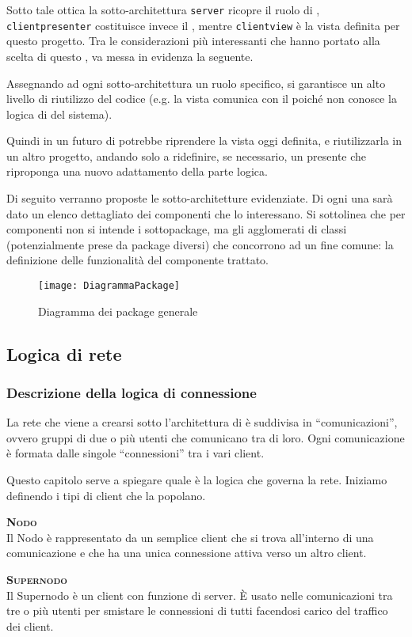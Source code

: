 Sotto tale ottica la sotto-architettura \texttt{server} ricopre il ruolo di , \texttt{clientpresenter} costituisce invece il , mentre \texttt{clientview} è la vista definita per questo progetto. Tra le considerazioni più interessanti che hanno portato alla scelta di questo , va messa in evidenza la seguente.

Assegnando ad ogni sotto-architettura un ruolo specifico, si garantisce un alto livello di riutilizzo del codice (e.g. la vista comunica con il  poiché non conosce la logica di  del sistema).

Quindi in un futuro di potrebbe riprendere la vista oggi definita, e riutilizzarla in un altro progetto, andando solo a ridefinire, se necessario, un presente che riproponga una nuovo adattamento della parte logica.

Di seguito verranno proposte le sotto-architetture evidenziate. Di ogni una sarà dato un elenco dettagliato dei componenti che lo interessano. Si sottolinea che per componenti non si intende i sottopackage, ma gli agglomerati di classi (potenzialmente prese da package diversi) che concorrono ad un fine comune: la definizione delle funzionalità del componente trattato.
\begin{figure}[H]
\begin{center}
\texttt{[image: DiagrammaPackage]}
\caption{Diagramma dei package generale}\label{fig:packagegenerale}
\end{center}
\end{figure}

\newpage

\subsection{Logica di rete}
\subsubsection{Descrizione della logica di connessione}
La rete che viene a crearsi sotto l'architettura di \caName{} è suddivisa in ``comunicazioni'', ovvero gruppi di due o più utenti che comunicano tra di loro. Ogni comunicazione è formata dalle singole ``connessioni'' tra i vari client.

Questo capitolo serve a spiegare quale è la logica che governa la rete. Iniziamo definendo i tipi di client che la popolano.
\begin{description}
	\item{\scshape\bfseries Nodo}\\
	Il Nodo è rappresentato da un semplice client che si trova all'interno di una comunicazione e che ha una unica connessione attiva verso un altro client.
	\item{\scshape\bfseries Supernodo}\\
	Il Supernodo è un client con funzione di server. È usato nelle comunicazioni tra tre o più utenti per smistare le connessioni di tutti facendosi carico del traffico dei client.
\end{description}

